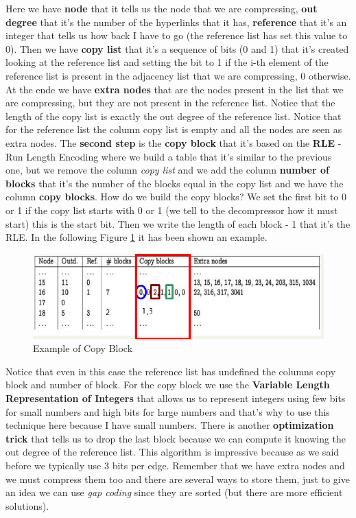 Here we have \textbf{node} that it tells us the node that we are compressing, \textbf{out degree} that it's the number of the hyperlinks that it has, \textbf{reference} that it's an integer that tells us how back I have to go (the reference list has set this value to 0). Then we have \textbf{copy list} that it's a sequence of bits (0 and 1) that it's created looking at the reference list and setting the bit to 1 if the i-th element of the reference list is present in the adjacency list that we are compressing, 0 otherwise. At the ende we have \textbf{extra nodes} that are the nodes present in the list that we are compressing, but they are not present in the reference list. Notice that the length of the copy list is exactly the out degree of the reference list.\newline
Notice that for the reference list the column copy list is empty and all the nodes are seen as extra nodes.\newline
The \textbf{second step} is the \textbf{copy block} that it's based on the \textbf{RLE} - Run Length Encoding where we build a table that it's similar to the previous one, but we remove the column \textit{copy list} and we add the column \textbf{number of blocks} that it's the number of the blocks equal in the copy list and we have the column \textbf{copy blocks}.\newline
How do we build the copy blocks? We set the first bit to 0 or 1 if the copy list starts with 0 or 1 (we tell to the decompressor how it must start) this is the start bit. Then we write the length of each block - 1 that it's the RLE. 
In the following Figure \ref{fig:copyblock} it has been shown an example.
\begin{figure}
    \centering
    \includegraphics[width=0.75\linewidth]{images/copyblock.png}
    \caption{Example of Copy Block}
    \label{fig:copyblock}
\end{figure}
Notice that even in this case the reference list has undefined the columns copy block and number of block.\newline
For the copy block we use the \textbf{Variable Length Representation of Integers} that allows us to represent integers using few bits for small numbers and high bits for large numbers and that's why to use this technique here because I have small numbers.\newline
There is another \textbf{optimization trick} that tells us to drop the last block because we can compute it knowing the out degree of the reference list.\newline
This algorithm is impressive because as we said before we typically use 3 bits per edge.\newline
Remember that we have extra nodes and we must compress them too and there are several ways to store them, just to give an idea we can use \textit{gap coding} since they are sorted (but there are more efficient solutions).\newline


